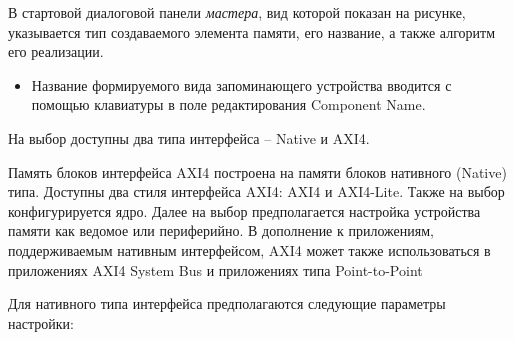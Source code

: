 В стартовой диалоговой панели \emph {мастера}, вид которой показан на рисунке, указывается тип создаваемого элемента памяти, его название, а также алгоритм его реализации. 
\begin{itemize}
\item Название формируемого вида запоминающего устройства вводится с помощью клавиатуры в поле редактирования Component Name.
\end{itemize}

На выбор доступны два типа интерфейса – Native и AXI4.

Память блоков интерфейса AXI4 построена на памяти блоков нативного (Native) типа. Доступны два стиля интерфейса AXI4: AXI4 и AXI4-Lite. Также на выбор конфигурируется ядро. Далее на выбор предполагается настройка устройства памяти как ведомое или периферийно. В дополнение к приложениям, поддерживаемым нативным интерфейсом, AXI4 может также использоваться в приложениях AXI4 System Bus и приложениях типа Point-to-Point

Для нативного типа интерфейса предполагаются следующие параметры настройки:

